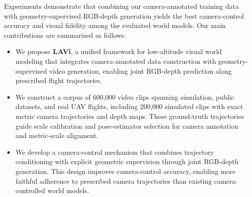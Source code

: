 \begingroup
\setlength{\parskip}{0pt}
Experiments demonstrate that combining our camera-annotated training data with geometry-supervised RGB-depth generation yields the best camera-control accuracy and visual fidelity among the evaluated world models.
Our main contributions are summarized as follows:
\begin{itemize}[topsep=2pt,partopsep=0pt,parsep=0pt,itemsep=0pt]
    \item We propose \textbf{LAVi}, a unified framework for low-altitude visual world modeling that integrates camera-annotated data construction with geometry-supervised video generation, enabling joint RGB-depth prediction along prescribed flight trajectories.
    \item We construct a corpus of 600,000 video clips spanning simulation, public datasets, and real UAV flights, including 200,000 simulated clips with exact metric camera trajectories and depth maps. These ground-truth trajectories guide scale calibration and pose-estimator selection for camera annotation and metric-scale alignment.
    \item We develop a camera-control mechanism that combines trajectory conditioning with explicit geometric supervision through joint RGB-depth generation. This design improves camera-control accuracy, enabling more faithful adherence to prescribed camera trajectories than existing camera-controlled world models.
\end{itemize}
\endgroup
